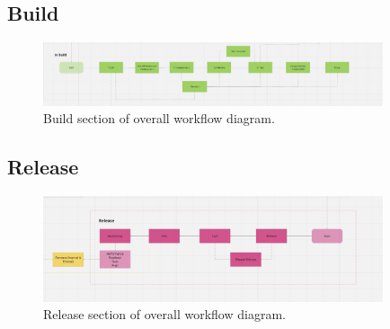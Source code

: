   \subsection{Build}
  \begin{figure}[H]
    \centering
    \includegraphics[width=10cm]{assets/workflow/build.png}
    \caption{Build section of overall workflow diagram.}
    \label{fig:workflowBuild}
  \end{figure}

  \subsection{Release}
  \begin{figure}[H]
    \centering
    \includegraphics[width=10cm]{assets/workflow/release.png}
    \caption{Release section of overall workflow diagram.}
    \label{fig:workflowRelease}
  \end{figure}

\newpage